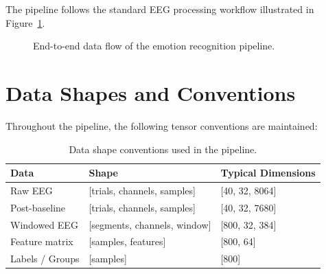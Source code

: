 \documentclass[12pt,a4paper]{report}
\begin{document}
The pipeline follows the standard EEG processing workflow illustrated in
Figure~\ref{fig:pipeline}.

\begin{figure}[H]
\centering
{}
\caption{End-to-end data flow of the emotion recognition pipeline.}
\label{fig:pipeline}
\end{figure}

\section{Data Shapes and Conventions}

Throughout the pipeline, the following tensor conventions are maintained:

\begin{table}[H]
\centering
\caption{Data shape conventions used in the pipeline.}
\label{tab:shapes}
\begin{tabular}{lll}
\toprule
\textbf{Data} & \textbf{Shape} & \textbf{Typical Dimensions} \\
\midrule
Raw EEG         & [trials, channels, samples] & [40, 32, 8064] \\
Post-baseline   & [trials, channels, samples] & [40, 32, 7680] \\
Windowed EEG    & [segments, channels, window] & [800, 32, 384] \\
Feature matrix  & [samples, features]          & [800, 64] \\
Labels / Groups & [samples]                    & [800] \\
\bottomrule
\end{tabular}
\end{table}
\end{document}
